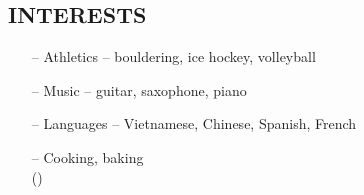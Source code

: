 \documentclass{aanguyen_res}
\begin{document}
\begin{sidebar}
    \section{INTERESTS}
      \begin{itemize}[leftmargin=0.45cm, noitemsep, topsep=0.0cm]%
        \item[--] Athletics -- bouldering, ice hockey, volleyball
        \item[--] Music -- guitar, saxophone, piano
        \item[--] Languages -- Vietnamese, Chinese, Spanish, French
        \item[--] Cooking, baking \\ ()
      \end{itemize}%
  \end{sidebar}
\end{document}

